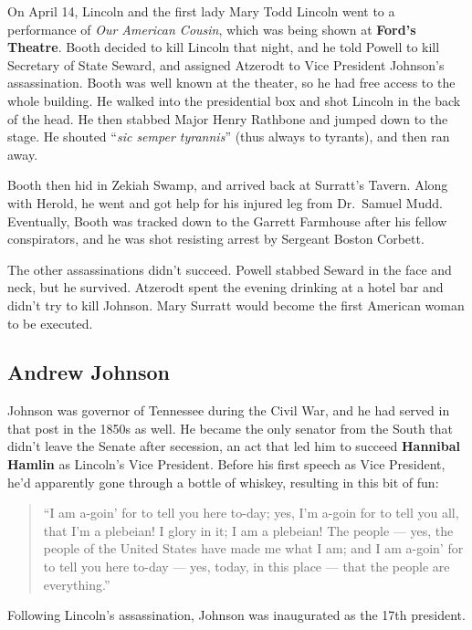 On April 14, Lincoln and the first lady Mary Todd Lincoln went to a performance of \textit{Our American Cousin},
which was being shown at \textbf{Ford's Theatre}.
Booth decided to kill Lincoln that night, and he told Powell to kill Secretary of State Seward,
and assigned Atzerodt to Vice President Johnson's assassination.
Booth was well known at the theater, so he had free access to the whole building.
He walked into the presidential box and shot Lincoln in the back of the head.
He then stabbed Major Henry Rathbone and jumped down to the stage.
He shouted ``\textit{sic semper tyrannis}'' (thus always to tyrants), and then ran away.

Booth then hid in Zekiah Swamp, and arrived back at Surratt's Tavern.
Along with Herold, he went and got help for his injured leg from Dr.\ Samuel Mudd.
Eventually, Booth was tracked down to the Garrett Farmhouse after his fellow conspirators,
and he was shot resisting arrest by Sergeant Boston Corbett.

The other assassinations didn't succeed.
Powell stabbed Seward in the face and neck, but he survived.
Atzerodt spent the evening drinking at a hotel bar and didn't try to kill Johnson.
Mary Surratt would become the first American woman to be executed.

\subsection*{Andrew Johnson}

Johnson was governor of Tennessee during the Civil War, and he had served in that post in the 1850s as well.
He became the only senator from the South that didn't leave the Senate after secession,
an act that led him to succeed \textbf{Hannibal Hamlin} as Lincoln's Vice President.
Before his first speech as Vice President, he'd apparently gone through a bottle of whiskey,
resulting in this bit of fun:

\begin{quotation}
  ``I am a-goin' for to tell you here to-day;
  yes, I'm a-goin for to tell you all, that I'm a plebeian!
  I glory in it; I am a plebeian!
  The people --- yes, the people of the United States have made me what I am;
  and I am a-goin' for to tell you here to-day --- yes, today, in this place --- that the people are everything.''
\end{quotation}

Following Lincoln's assassination, Johnson was inaugurated as the 17th president.

